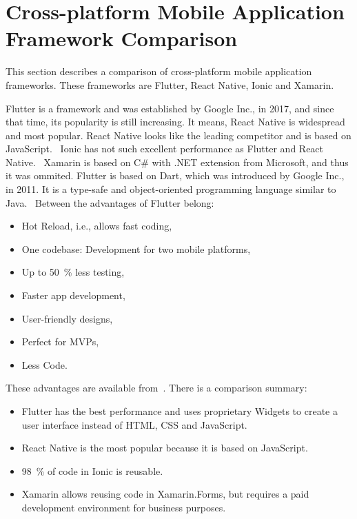 \section{Cross-platform Mobile Application Framework Comparison}\label{sec:cross-platform-mobile-application-framework-comparison}
This section describes a comparison of cross-platform mobile application frameworks.
These frameworks are Flutter, React Native, Ionic and Xamarin.

Flutter is a framework and was established by Google Inc., in 2017, and since that time, its popularity is still increasing.
It means, React Native is widespread and most popular.
React Native looks like the leading competitor and is based on JavaScript.~\cite{flutterVsReactNativeNevercodeIo}
Ionic has not such excellent performance as Flutter and React Native.~\cite{crossPlatformFrameworokComparation}
Xamarin is based on C\# with .NET extension from Microsoft, and thus it was ommited.
Flutter is based on Dart, which was introduced by Google Inc., in 2011.
It is a type-safe and object-oriented programming language similar to Java.~\cite{dartTypeSystem}
\newline
\newline
\newline
\newline
Between the advantages of Flutter belong:
\begin{itemize}
    \item Hot Reload, i.e., allows fast coding,
    \item One codebase: Development for two mobile platforms,
    \item Up to 50~\% less testing,
    \item Faster app development,
    \item User-friendly designs,
    \item Perfect for MVPs,
    \item Less Code.
\end{itemize}
These advantages are available from~\cite{flutterVsReactNativeHackrIo}.
\newline
\newline
There is a comparison summary:
\begin{itemize}
    \item Flutter has the best performance and uses proprietary Widgets to create a user interface instead of HTML, CSS and JavaScript.
    \item React Native is the most popular because it is based on JavaScript.
    \item 98~\% of code in Ionic is reusable.
    \item Xamarin allows reusing code in Xamarin.Forms, but requires a paid development environment for business purposes.
\end{itemize}
